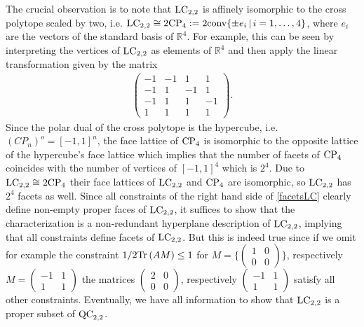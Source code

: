 The crucial observation is to note that $ \textup{LC}_{2,2} $ is affinely isomorphic to the cross polytope scaled  by two, i.e. 
$ \textup{LC}_{2,2} \cong 2\textup{CP}_4 := 2\textup{conv} \{  \pm e_i \, | \, i = 1,\hdots,4 \} $, where $ e_i $ are the vectors of the standard basis of $ \mathbb{R}^4 $. For example, this can be seen by interpreting the vertices of $ \textup{LC}_{2,2} $ as elements of $ \mathbb{R}^4 $ and then apply the linear transformation given by the matrix 
\begin{align*}
	\begin{pmatrix}
		-1 & -1 & 1 & 1 \\
		-1 & 1 & -1 & 1 \\
		-1 & 1 & 1 & -1 \\
		1 & 1 & 1 & 1 
	\end{pmatrix}.
\end{align*}
Since the polar dual of the cross polytope is the hypercube, i.e. $ (CP_n)^o = [-1,1]^n $,  the face lattice of $ \textup{CP}_4 $ is isomorphic to the opposite lattice of the hypercube's face lattice which implies that the number of facets of $ \textup{CP}_4 $ coincides with the number of vertices of $ [-1,1]^4 $ which is $ 2^4 $. Due to $  \textup{LC}_{2,2} \cong 2\textup{CP}_4$ their face lattices of $ \textup{LC}_{2,2} $ and $ \textup{CP}_4 $ are isomorphic, so $ \textup{LC}_{2,2} $ has $ 2^4 $ facets as well. 
Since all constraints of the right hand side of \ref{facetsLC} clearly define non-empty proper faces of $ \textup{LC}_{2,2} $, it suffices to show that the characterization is a non-redundant hyperplane description of $ \textup{LC}_{2,2} $, implying that all constraints define facets of $ \textup{LC}_{2,2} $. But this is indeed true since if we omit for example the constraint 
$ 1/2 \text{Tr} \, {(AM)}  \le 1 $ for $ M = \{ \begin{pmatrix}
1 & 0 \\ 0 & 0
\end{pmatrix} \} $, respectively $ M = \begin{pmatrix}
-1 & 1 \\ 1 & 1 
\end{pmatrix} $
the matrices $ \begin{pmatrix}
2 & 0 \\ 0 & 0 
\end{pmatrix} $, respectively $ \begin{pmatrix}
-1 & 1 \\ 1 & 1
\end{pmatrix} $ 
satisfy all other constraints. 
Eventually, we have all information to show that $ \textup{LC}_{2,2} $ is a proper subset of $ \textup{QC}_{2,2} $. 
